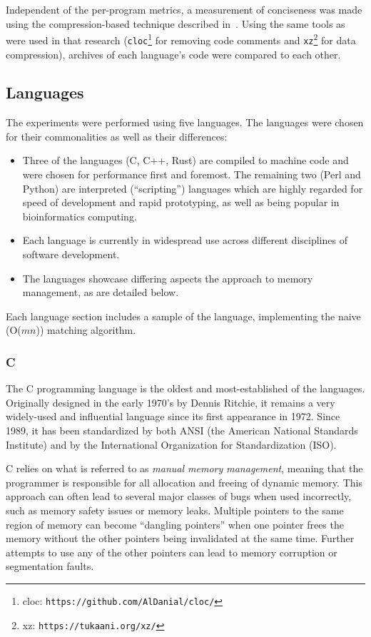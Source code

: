 Independent of the per-program metrics, a measurement of conciseness was made using the compression-based technique described in~\citep{bergmans.et.al.2021}. Using the same tools as were used in that research (\texttt{cloc}\footnote{cloc: \texttt{https://github.com/AlDanial/cloc/}} for removing code comments and \texttt{xz}\footnote{xz: \texttt{https://tukaani.org/xz/}} for data compression), archives of each language's code were compared to each other.

\subsection{Languages}
\label{subsec:languages}

The experiments were performed using five languages. The languages were chosen for their commonalities as well as their differences:

\begin{itemize}
\item Three of the languages (C, C++, Rust) are compiled to machine code and were chosen for performance first and foremost. The remaining two (Perl and Python) are interpreted (``scripting'') languages which are highly regarded for speed of development and rapid prototyping, as well as being popular in bioinformatics computing.
\item Each language is currently in widespread use across different disciplines of software development.
\item The languages showcase differing aspects the approach to memory management, as are detailed below.
\end{itemize}

Each language section includes a sample of the language, implementing the naive (O($mn$)) matching algorithm.

\subsubsection{C}

The C programming language is the oldest and most-established of the languages. Originally designed in the early 1970's by Dennis Ritchie, it remains a very widely-used and influential language since its first appearance in 1972. Since 1989, it has been standardized by both ANSI (the American National Standards Institute) and by the International Organization for Standardization (ISO).

C relies on what is referred to as \textit{manual memory management}, meaning that the programmer is responsible for all allocation and freeing of dynamic memory. This approach can often lead to several major classes of bugs when used incorrectly, such as memory safety issues or memory leaks. Multiple pointers to the same region of memory can become ``dangling pointers'' when one pointer frees the memory without the other pointers being invalidated at the same time. Further attempts to use any of the other pointers can lead to memory corruption or segmentation faults.

